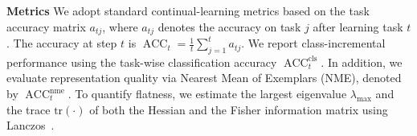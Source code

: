 \documentclass{article}
\theoremstyle{plain}
\theoremstyle{definition}
\theoremstyle{remark}
\begin{document}
\noindent\textbf{Metrics}\quad
We adopt standard continual-learning metrics based on the task accuracy matrix $a_{tj}$, where $a_{tj}$ denotes the accuracy on task $j$ after learning task $t$. The accuracy at step $t$ is
$
\operatorname{ACC}_t = \frac{1}{t} \sum_{j=1}^{t} a_{tj}
$.
We report class-incremental performance using the task-wise classification accuracy $\operatorname{ACC}_t^{\mathrm{cls}}$.
In addition, we evaluate representation quality via Nearest Mean of Exemplars (NME), denoted by $\operatorname{ACC}_t^{\mathrm{nme}}$.
To quantify flatness, we estimate the largest eigenvalue $\lambda_{\max}$ and the trace $\mathrm{tr}(\cdot)$ of both the Hessian and the Fisher information matrix using Lanczos~\cite{ghorbaniInvestigationNeuralNet2019,foretSharpnessAwareMinimizationEfficiently2021}.
\end{document}
